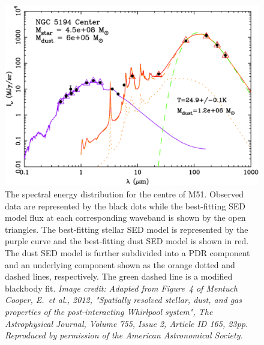 \begin{figure}[!h]
 \begin{center}
 \includegraphics[width=\columnwidth]{ch1/M51_SED_Mentuch2012.eps}
  \caption[Spectral energy distribution of the centre of M51]{The spectral energy distribution for the centre of M51.  Observed data are represented by the black dots while the best-fitting SED model flux at each corresponding waveband is shown by the open triangles.  The best-fitting stellar SED model is represented by the purple curve and the best-fitting dust SED model is shown in red.  The dust SED model is further subdivided into a PDR component and an underlying component shown as the orange dotted and dashed lines, respectively.  The green dashed line is a modified blackbody fit. \emph{Image credit: Adapted from Figure~4 of Mentuch Cooper, E.~et al., 2012, "Spatially resolved stellar, dust, and gas properties of the post-interacting Whirlpool system", The Astrophysical Journal, Volume 755, Issue 2, Article ID 165, 23pp.  Reproduced by permission of the American Astronomical Society.}
  \label{fig:M51_sed}}
 \end{center}
\end{figure}

